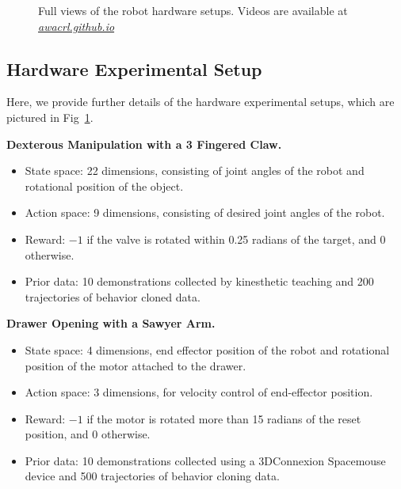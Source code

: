 \documentclass[conference]{IEEEtran}
\newcommand\projectpage{\href{https://awacrl.github.io/}{\textit{awacrl.github.io}}}
\begin{document}
\begin{figure}[t]
\begin{subfigure}[b]{0.32\textwidth}
    \end{subfigure}
    \caption{
    Full views of the robot hardware setups. Videos are available at \projectpage
    }
    \label{fig:robot_setups}
\end{figure}

\pagebreak

\subsection{Hardware Experimental Setup}
\label{sec:hardwaresetup}

Here, we provide further details of the hardware experimental setups, which are pictured in Fig~\ref{fig:robot_setups}.

\noindent \textbf{Dexterous Manipulation with a 3 Fingered Claw.}
\begin{itemize}
    \item State space: 22 dimensions, consisting of joint angles of the robot and rotational position of the object. 
    \item Action space: 9 dimensions, consisting of desired joint angles of the robot.
    \item Reward: $-1$ if the valve is rotated within 0.25 radians of the target, and $0$ otherwise.
    \item Prior data: 10 demonstrations collected by kinesthetic teaching and 200 trajectories of behavior cloned data.
\end{itemize}

\noindent \textbf{Drawer Opening with a Sawyer Arm.}
\begin{itemize}
    \item State space: 4 dimensions, end effector position of the robot and rotational position of the motor attached to the drawer. 
    \item Action space: 3 dimensions, for velocity control of end-effector position.
    \item Reward: $-1$ if the motor is rotated more than 15 radians of the reset position, and $0$ otherwise.
    \item Prior data: 10 demonstrations collected using a 3DConnexion Spacemouse device and 500 trajectories of behavior cloning data.
\end{itemize}
\end{document}
